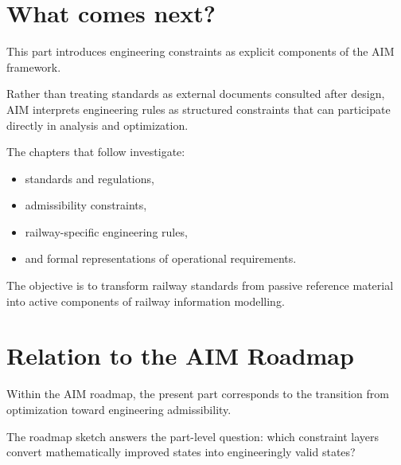 \section*{What comes next?}

This part introduces engineering constraints as explicit components of
the AIM framework.

Rather than treating standards as external documents consulted after
design, AIM interprets engineering rules as structured constraints that
can participate directly in analysis and optimization.

The chapters that follow investigate:
\begin{itemize}
\item standards and regulations,
\item admissibility constraints,
\item railway-specific engineering rules,
\item and formal representations of operational requirements.
\end{itemize}

The objective is to transform railway standards from passive reference
material into active components of railway information modelling.

\section*{Relation to the AIM Roadmap}

Within the AIM roadmap, the present part corresponds to the transition
from optimization toward engineering admissibility.

The roadmap sketch answers the part-level question: which constraint
layers convert mathematically improved states into engineeringly valid
states?

\begin{center}
\end{center}

